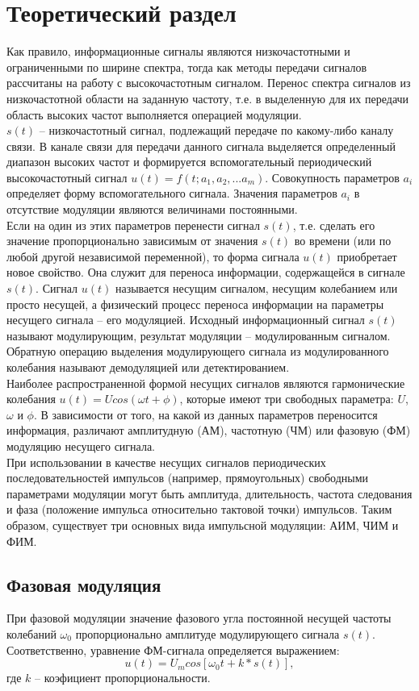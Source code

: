 \documentclass[a4paper]{article}
\begin{document}
\section{Теоретический раздел}
Как правило, информационные сигналы являются низкочастотными и ограниченными по ширине спектра, тогда как методы передачи сигналов рассчитаны на работу с высокочастотным сигналом. Перенос спектра сигналов из низкочастотной области на заданную частоту, т.е. в выделенную для их передачи область высоких частот выполняется операцией модуляции.\\
$s(t)$ -- низкочастотный сигнал, подлежащий передаче по какому-либо каналу связи. В канале связи для передачи данного сигнала выделяется определенный диапазон высоких частот и формируется вспомогательный периодический высокочастотный сигнал $u(t) = f(t; a_1, a_2, ... a_m).$ Совокупность параметров $a_i$ определяет форму вспомогательного сигнала. Значения параметров $a_i$ в отсутствие модуляции являются величинами постоянными.\\
Если на один из этих параметров перенести сигнал $s(t)$, т.е. сделать его значение пропорционально зависимым от значения $s(t)$ во времени (или по любой другой независимой переменной), то форма сигнала $u(t)$ приобретает новое свойство. Она служит для переноса информации, содержащейся в сигнале $s(t)$. Сигнал $u(t)$ называется несущим сигналом, несущим колебанием или просто несущей, а физический процесс переноса информации на параметры несущего сигнала -- его модуляцией. Исходный информационный сигнал $s(t)$ называют модулирующим, результат модуляции -- модулированным сигналом. Обратную операцию выделения модулирующего сигнала из модулированного колебания называют демодуляцией или детектированием.\\
Наиболее распространенной формой несущих сигналов являются гармонические колебания $u(t)=Ucos(\omega t+\phi)$, которые имеют три свободных параметра: $U$, $\omega$ и $\phi$. В зависимости от того, на какой из данных параметров переносится информация, различают амплитудную (АМ), частотную (ЧМ) или фазовую (ФМ) модуляцию несущего сигнала.\\
При использовании в качестве несущих сигналов периодических последовательностей импульсов (например, прямоугольных) свободными параметрами модуляции могут быть амплитуда, длительность, частота следования и фаза (положение импульса относительно тактовой точки) импульсов. Таким образом, существует три основных вида импульсной модуляции: АИМ, ЧИМ и ФИМ.
\subsection{Фазовая модуляция}
При фазовой модуляции значение фазового угла постоянной несущей частоты колебаний $\omega_0$ пропорционально амплитуде модулирующего сигнала $s(t)$. Соответственно, уравнение ФМ-сигнала определяется выражением:
$$u(t) = U_m cos[\omega_0 t+k*s(t)],$$ где $k$ -- коэфициент пропорциональности.
\end{document}
